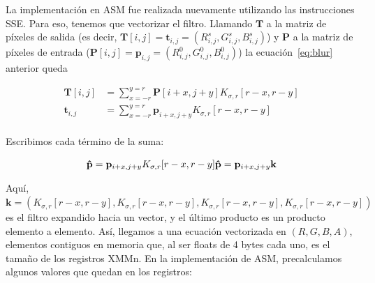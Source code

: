 La implementación en ASM fue realizada nuevamente utilizando las
instrucciones {\ttfamily SSE}. Para eso, tenemos que vectorizar el
filtro. Llamando $\mathbf{T}$ a la matriz de píxeles de salida (es decir,
$\mathbf{T}[i, j] = \mathbf{t}_{i, j} = (R^s_{i, j}, G^s_{i, j},
B^s_{i, j})$)
y $\mathbf{P}$ a la matriz de píxeles de entrada
($\mathbf{P}[i, j] = \mathbf{p}_{i, j} = (R^0_{i, j}, G^0_{i, j},
B^0_{i, j})$) la ecuación~\ref{eq:blur} anterior queda

\begin{align}
  \mathbf{T}[i, j] &= \sum_{x=-r}^{y=r} \mathbf{P}[i+x, j+y] K_{\sigma,
                     r} [r-x, r-y] \\
  \mathbf{t}_{i, j} &= \sum_{x=-r}^{y=r} \mathbf{p}_{i+x, j+y} K_{\sigma,
                     r}[r-x, r-y]\\
\end{align}

Escribimos cada término de la suma:

\begin{equation}
  \mathbf{\hat{p}} = \mathbf{p}_{i+x, j+y} K_{\sigma, r}[r-x, r-y] \\
  \mathbf{\hat{p}} = \mathbf{p}_{i+x, j+y} \mathbf{k} 
  \label{eq:blur_vec}
\end{equation}

Aquí,
$\mathbf{k} = (K_{\sigma, r}[r-x, r-y], K_{\sigma, r}[r-x, r-y],
K_{\sigma, r}[r-x, r-y], K_{\sigma, r}[r-x, r-y])$
es el filtro expandido hacia un vector, y el último producto es un
producto elemento a elemento. Así, llegamos a una ecuación vectorizada
en $(R, G, B, A)$, elementos contiguos en memoria que, al ser floats
de 4 bytes cada uno, es el tamaño de los registros {\ttfamily
  XMMn}. En la implementación de ASM, precalculamos algunos valores
que quedan en los registros:

